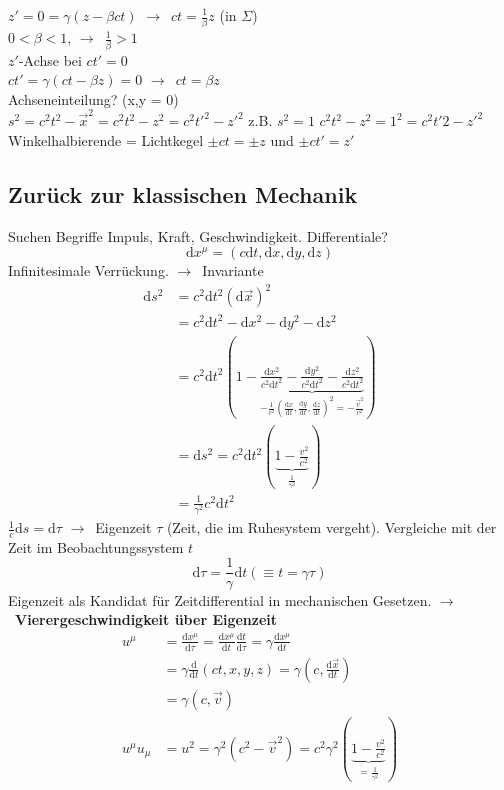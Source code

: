 \documentclass[oneside]{book}
\theoremstyle{definition}
\newcommand{\conseq}{$\rightarrow$~}
\renewcommand{\d}{\mathrm d}
\newcommand{\dd}[1]{\frac{\d}{\d #1}}
\newcommand{\ddd}[2]{\frac{\d #1}{\d #2}}
\begin{document}
$z' = 0 = \gamma (z - \beta c t)$ \conseq $ct = \frac{1}{\beta} z$ (in $\Sigma$)\\
$0 < \beta < 1$, \conseq $\frac{1}{\beta} > 1$\\

$z'$-Achse bei $ct' = 0$\\

$c t' = \gamma (ct - \beta z) = 0$ \conseq $ct = \beta z$\\

Achseneinteilung? (x,y = 0)\\
$s^2 = c^2 t^2 - \vec{x}^2 = c^2 t^2 - z^2 = c^2 {t'}^2 - z'^2$ 
z.B. $s^2 = 1$
$c^2 t^2 - z^2 = 1^2 = c^2 t'2 - z'^2$\\
Winkelhalbierende = Lichtkegel $\pm ct = \pm z$ und $\pm c t' = z'$


\subsection{Zurück zur klassischen Mechanik}
Suchen Begriffe Impuls, Kraft, Geschwindigkeit. Differentiale?
$$\d x^\mu = (c \d t, \d x, \d y, \d z)$$
Infinitesimale Verrückung.
\conseq Invariante
\begin{align*}
 \d s^2  &= c^2 \d t^2 (\d \vec{x})^2\\
 & = c^2 \d t^2 - \d x^2 - \d y^2 - \d z^2\\
 & = c^2 \d t^2 (1 - \underbrace{\frac{\d x^2}{c^2 \d t^2} - \frac{\d y^2}{c^2 \d t^2} - \frac{\d z^2}{c^2 \d t^2}}_{- \frac{1}{c^2} (\ddd x t, \ddd y t, \ddd z t)^2 = - \frac{\vec{v}^2}{c^2}})\\
 & = \d s^2 = c^2 \d t^2 (\underbrace{1 - \frac{v^2}{c^2}}_{\frac{1}{\gamma^2}})\\
 & = \frac{1}{\gamma^2} c^2 \d t^2
\end{align*}
$\frac{1}{c} \d s = \d \tau$ \conseq Eigenzeit $\tau$ (Zeit, die im Ruhesystem vergeht).
Vergleiche mit der Zeit im Beobachtungssystem $t$
$$\d \tau = \frac{1}{\gamma} \d t (\equiv t = \gamma \tau)$$
Eigenzeit als Kandidat für Zeitdifferential in mechanischen Gesetzen.
\conseq \textbf{Vierergeschwindigkeit über Eigenzeit}
\begin{align*}
	u^\mu &= \ddd{x^\mu}{\tau} = \ddd{x^\mu}{t} \ddd t \tau = \gamma \ddd{x^\mu}{t}\\
	&= \gamma \dd t (c t, x, y, z) = \gamma (c, \ddd{\vec{x}}{t})\\
	&= \gamma (c, \vec{v})\\
	u^\mu u_\mu &= u^2 = \gamma^2 (c^2 - \vec{v}^2) = c^2 \gamma^2 (\underbrace{1 - \frac{v^2}{c^2}}_{= \frac{1}{\gamma^2}})
\end{align*}
\end{document}
